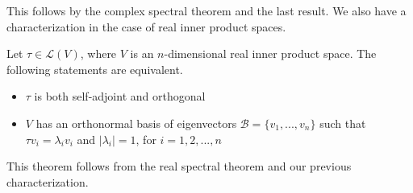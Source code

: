 This follows by the complex spectral theorem and the last result. We also have a characterization in the case of real inner product spaces.

\begin{theorem}
    Let $\tau \in \mathcal{L}(V)$, where $V$ is an $n$-dimensional real inner product space. The following statements are equivalent.
    \begin{itemize}
        \item $\tau$ is both self-adjoint and orthogonal
        \item $V$ has an orthonormal basis of eigenvectors $\mathcal{B} = \{v_1,...,v_n\}$ such that $\tau v_i = \lambda_iv_i$ and $|\lambda_i| = 1$, for $i = 1,2,...,n$
    \end{itemize}
\end{theorem}

This theorem follows from the real spectral theorem and our previous characterization.
